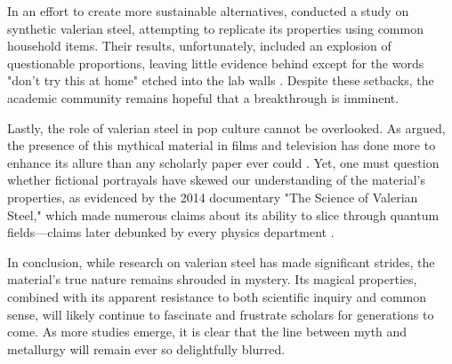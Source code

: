 In an effort to create more sustainable alternatives, \cite{clinkhammer2018} conducted a study on synthetic valerian steel, attempting to replicate its properties using common household items. Their results, unfortunately, included an explosion of questionable proportions, leaving little evidence behind except for the words "don’t try this at home" etched into the lab walls \cite{clinkhammer2018}. Despite these setbacks, the academic community remains hopeful that a breakthrough is imminent.

Lastly, the role of valerian steel in pop culture cannot be overlooked. As \cite{johnson2020} argued, the presence of this mythical material in films and television has done more to enhance its allure than any scholarly paper ever could \cite{johnson2020}. Yet, one must question whether fictional portrayals have skewed our understanding of the material’s properties, as evidenced by the 2014 documentary "The Science of Valerian Steel," which made numerous claims about its ability to slice through quantum fields—claims later debunked by every physics department \cite{burton2014}.

In conclusion, while research on valerian steel has made significant strides, the material’s true nature remains shrouded in mystery. Its magical properties, combined with its apparent resistance to both scientific inquiry and common sense, will likely continue to fascinate and frustrate scholars for generations to come. As more studies emerge, it is clear that the line between myth and metallurgy will remain ever so delightfully blurred.